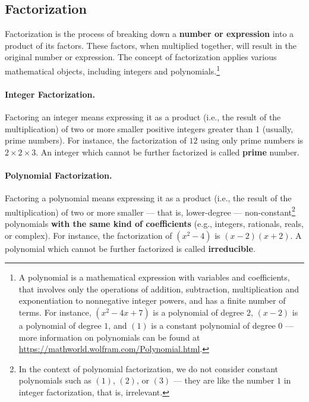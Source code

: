 \subsection{Factorization}\label{sec:mathematical_underpinnings:factorization}

Factorization is the process of breaking down a \textbf{number or expression} into a product of its factors. These factors, when multiplied together, will result in the original number or expression. The concept of factorization applies various mathematical objects, including integers and polynomials.\footnote{A polynomial is a mathematical expression with variables and coefficients, that involves only the operations of addition, subtraction, multiplication and exponentiation to nonnegative integer powers, and has a finite number of terms. For instance, $(x^2 - 4x + 7)$ is a polynomial of degree $2$, $(x - 2)$ is a polynomial of degree $1$, and $(1)$ is a constant polynomial of degree $0$ --- more information on polynomials can be found at \url{https://mathworld.wolfram.com/Polynomial.html}.}

\paragraph*{Integer Factorization.} Factoring an integer means expressing it as a product (i.e., the result of the multiplication) of two or more smaller positive integers greater than 1 (usually, prime numbers). For instance, the factorization of $12$ using only prime numbers is $2 \times 2 \times 3$. An integer which cannot be further factorized is called \textbf{prime} number.

\paragraph*{Polynomial Factorization.} Factoring a polynomial means expressing it as a product (i.e., the result of the multiplication) of two or more smaller --- that is, lower-degree --- non-constant\footnote{In the context of polynomial factorization, we do not consider constant polynomials such as $(1)$, $(2)$, or $(3)$ --- they are like the number $1$ in integer factorization, that is, irrelevant.} polynomials \textbf{with the same kind of coefficients} (e.g., integers, rationals, reals, or complex). For instance, the factorization of $(x^2 - 4)$ is $(x - 2)(x + 2)$. A polynomial which cannot be further factorized is called \textbf{irreducible}.


